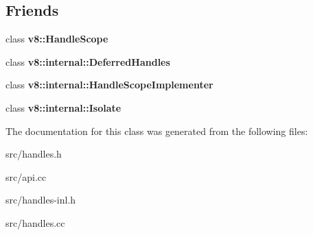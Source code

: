 \subsection*{Friends}
\begin{DoxyCompactItemize}
\item 
\hypertarget{classv8_1_1internal_1_1_handle_scope_a8b16bf00a6bc5a91a76e86067d2f9dfc}{}class {\bfseries v8\+::\+Handle\+Scope}\label{classv8_1_1internal_1_1_handle_scope_a8b16bf00a6bc5a91a76e86067d2f9dfc}

\item 
\hypertarget{classv8_1_1internal_1_1_handle_scope_a26c0e2d50a587b78bd065f5170f72d71}{}class {\bfseries v8\+::internal\+::\+Deferred\+Handles}\label{classv8_1_1internal_1_1_handle_scope_a26c0e2d50a587b78bd065f5170f72d71}

\item 
\hypertarget{classv8_1_1internal_1_1_handle_scope_a9dbe140a95e39dc79a65ca755627ce60}{}class {\bfseries v8\+::internal\+::\+Handle\+Scope\+Implementer}\label{classv8_1_1internal_1_1_handle_scope_a9dbe140a95e39dc79a65ca755627ce60}

\item 
\hypertarget{classv8_1_1internal_1_1_handle_scope_acda8e558d20805fa72df899e935081aa}{}class {\bfseries v8\+::internal\+::\+Isolate}\label{classv8_1_1internal_1_1_handle_scope_acda8e558d20805fa72df899e935081aa}

\end{DoxyCompactItemize}


The documentation for this class was generated from the following files\+:\begin{DoxyCompactItemize}
\item 
src/handles.\+h\item 
src/api.\+cc\item 
src/handles-\/inl.\+h\item 
src/handles.\+cc\end{DoxyCompactItemize}
